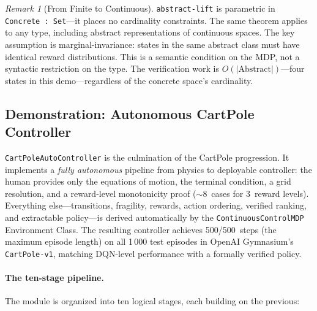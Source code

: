 \documentclass[9pt,a4paper]{article}
\theoremstyle{plain}
\theoremstyle{definition}
\theoremstyle{remark}
\newtheorem{remark}{Remark}
\begin{document}
\begin{remark}[From Finite to Continuous]
\texttt{abstract-lift} is parametric in \texttt{Concrete~:~Set}---it places no cardinality constraints.  The same theorem applies to any type, including abstract representations of continuous spaces.  The key assumption is marginal-invariance: states in the same abstract class must have identical reward distributions.  This is a semantic condition on the MDP, not a syntactic restriction on the type.  The verification work is $O(|\text{Abstract}|)$---four states in this demo---regardless of the concrete space's cardinality.
\end{remark}


\subsection{Demonstration: Autonomous CartPole Controller}
\label{sec:auto-cartpole}

\texttt{CartPoleAutoController} is the culmination of the CartPole progression.  It implements a \emph{fully autonomous} pipeline from physics to deployable controller: the human provides only the equations of motion, the terminal condition, a grid resolution, and a reward-level monotonicity proof (${\sim}$8~cases for 3~reward levels).  Everything else---transitions, fragility, rewards, action ordering, verified ranking, and extractable policy---is derived automatically by the \texttt{ContinuousControlMDP} Environment Class.  The resulting controller achieves 500/500~steps (the maximum episode length) on all 1\,000 test episodes in OpenAI Gymnasium's \texttt{CartPole-v1}, matching DQN-level performance with a formally verified policy.

\paragraph{The ten-stage pipeline.}
The module is organized into ten logical stages, each building on the previous:
\end{document}
